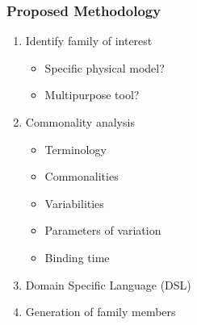 \documentclass[t,12pt,numbers,fleqn]{beamer}
\begin{document}

\begin{frame}

\frametitle{Proposed Methodology}

\begin{enumerate}

\item Identify family of interest
\begin{itemize}
\item Specific physical model?
\item Multipurpose tool?
\end{itemize}
\item Commonality analysis
\begin{itemize}
\item Terminology
\item Commonalities
\item Variabilities
\item Parameters of variation
\item Binding time
\end{itemize}
\item Domain Specific Language (DSL)
\item Generation of family members

\end{enumerate}

\end{frame}

\end{document}
